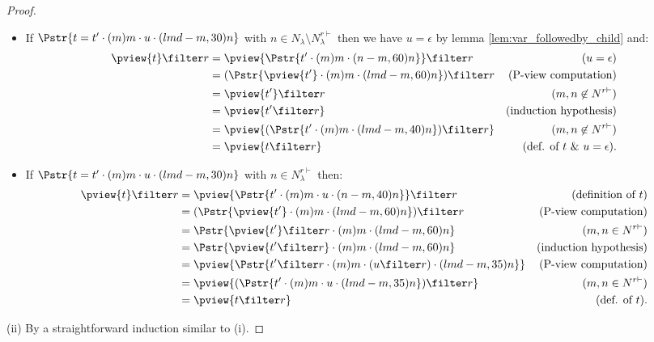 \begin{proof}
\begin{itemize}[-]
\item If $\Pstr{ t =  t' \cdot (m){m} \cdot  u \cdot (lmd-m,30){n}}$ with $n\in N_\lambda \setminus N^{r\vdash}_\lambda$ then we have $u = \epsilon$ by lemma
    \ref{lem:var_followedby_child} and:
        \begin{align*}
        \pview{t} \filter  r
        &= \pview{\Pstr{t' \cdot (m){m} \cdot (n-m,60){n}}} \filter  r
                                                        & (u=\epsilon)\\
        &= (\Pstr{\pview{t'} \cdot (m){m} \cdot (lmd-m,60){n}} ) \filter  r
                                                        & (\mbox{P-view computation}) \\
        &= \pview{t'} \filter  r                & (m, n \not\in N^{r\vdash}) \\
        &= \pview{t' \filter  r }               & \mbox{(induction hypothesis)} \\
        &= \pview{ (\Pstr{t' \cdot (m){m} \cdot (lmd-m,40){n}}) \filter r }
                                                        & (m, n \not\in N^{r\vdash}) \\
        &= \pview{ t \filter r }             & \mbox{(def. of $t$ \& $u = \epsilon$).}
        \end{align*}

\item If $\Pstr{ t =  t' \cdot (m){m} \cdot u \cdot (lmd-m,30){n} }$ with $n\in N^{r\vdash}_\lambda$ then:
        \begin{align*}
        \pview{t} \filter  r
        &= \pview{\Pstr{t' \cdot (m){m} \cdot u \cdot (n-m,40){n}}} \filter  r
                                                              & (\mbox{definition of } t)\\
        &= (\Pstr{\pview{t'} \cdot (m){m} \cdot  (lmd-m,60){n}}) \filter  r
                                                              & (\mbox{P-view computation}) \\
        &= \Pstr{ \pview{t'} \filter  r \cdot (m){m} \cdot  (lmd-m,60){n} }
                                                              & (m, n \in N^{r\vdash}) \\
        &= \Pstr{ \pview{t'\filter r}  \cdot (m){m} \cdot  (lmd-m,60){n} }
                                                              & \mbox{(induction hypothesis)} \\
        &= \pview{ \Pstr{t' \filter r \cdot (m){m} \cdot {(u \filter r)} \cdot (lmd-m,35){n}}}
                                                           & (\mbox{P-view computation}) \\
        &= \pview{ (\Pstr{t' \cdot (m){m} \cdot u \cdot (lmd-m,35){n}}) \filter r }
                                                           & (m, n \in N^{r\vdash}) \\
        &= \pview{ t \filter r }                & \mbox{(def. of $t$).}
        \end{align*}
\end{itemize}
(ii) By a straightforward induction similar to (i).
\end{proof}

